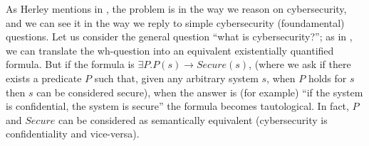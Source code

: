 \documentclass[conference]{IEEEtran}
\begin{document}
As
Herley mentions in \autocite{Herley2016usenixvideo}, the problem is in the way
we reason on cybersecurity, and we can see it in the way we reply to simple
cybersecurity (foundamental) questions.  Let us consider the general question
``what is cybersecurity?''; as in \autocite{hintikka2013inquiry}, we can
translate the wh-question into an equivalent existentially quantified formula.
But if the formula is $\exists P. P(s)\rightarrow Secure(s)$, (where we ask if
there exists a predicate $P$ such that, given any arbitrary system $s$, when
$P$ holds for $s$ then $s$ can be considered secure), when the answer is (for
example) ``if the system is confidential, the system is secure'' the formula
becomes tautological. In fact, $P$ and $Secure$ can be considered as
semantically equivalent (cybersecurity is confidentiality and vice-versa).
\end{document}
